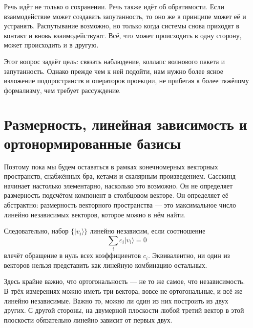 Речь идёт не только о сохранении. Речь также идёт об обратимости. Если взаимодействие может создавать запутанность, то оно же в принципе может её и устранять. Распутывание возможно, но только когда системы снова приходят в контакт и вновь взаимодействуют. Всё, что может происходить в одну сторону, может происходить и в другую.

\begin{classroomqa}
\end{classroomqa}

Этот вопрос задаёт цель: связать наблюдение, коллапс волнового пакета и запутанность. Однако прежде чем к ней подойти, нам нужно более ясное изложение подпространств и операторов проекции, не прибегая к более тяжёлому формализму, чем требует рассуждение.

\section{Размерность, линейная зависимость и ортонормированные базисы}

Поэтому пока мы будем оставаться в рамках конечномерных векторных пространств, снабжённых бра, кетами и скалярным произведением. Сасскинд начинает настолько элементарно, насколько это возможно. Он не определяет размерность подсчётом компонент в столбцовом векторе. Он определяет её абстрактно: размерность векторного пространства — это максимальное число линейно независимых векторов, которое можно в нём найти.

Следовательно, набор \(\{|v_i\rangle\}\) линейно независим, если соотношение
\begin{equation}
\sum_i c_i |v_i\rangle = 0
\end{equation}
влечёт обращение в нуль всех коэффициентов \(c_i\). Эквивалентно, ни один из векторов нельзя представить как линейную комбинацию остальных.

Здесь крайне важно, что ортогональность — не то же самое, что независимость. В трёх измерениях можно иметь три вектора, вовсе не ортогональные, и всё же линейно независимые. Важно то, можно ли один из них построить из двух других. С другой стороны, на двумерной плоскости любой третий вектор в этой плоскости обязательно линейно зависит от первых двух.

